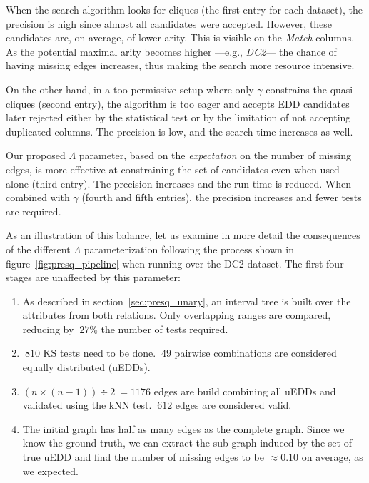 When the search algorithm looks for cliques (the first entry for each dataset),
the precision is high since almost all candidates were accepted. However,
these candidates are, on average, of lower arity. This is visible on the \emph{Match}
columns. As the potential maximal arity becomes higher ---e.g., \emph{DC2}--- the
chance of having missing edges increases, thus making the search more resource intensive.

On the other hand, in a too-permissive setup where only $\gamma$ constrains the quasi-cliques
(second entry), the algorithm is too eager and accepts \gls{EDD} candidates later rejected either
by the statistical test or by the limitation of not accepting duplicated columns.
The precision is low, and the search time increases as well.

Our proposed $\Lambda$ parameter, based on the \emph{expectation} on the number of missing edges,
is more effective at constraining the set of candidates even when used alone (third entry).
The precision increases and the run time is reduced.
When combined with $\gamma$ (fourth and fifth entries), the precision increases
and fewer tests are required.

As an illustration of this balance, let us examine in more detail the consequences of the
different $\Lambda$ parameterization following the process shown in figure~\ref{fig:presq_pipeline}
when running over the DC2 dataset. The first four stages are unaffected by this parameter:

\begin{enumerate}[label=({\alph*}),align=parleft,leftmargin=!,labelwidth=1em]
\item As described in section~\ref{sec:presq_unary}, an interval tree is built over the attributes
    from both relations. Only overlapping ranges are compared,
    reducing by $~27\%$ the number of tests required.
\item $~810$ KS tests need to be done. $~49$ pairwise combinations are considered equally distributed
    (\glspl{uEDD}).
\item $(n \times (n - 1)) \div 2 ~= 1176$ edges are build combining all \glspl{uEDD} and validated
    using the \gls{kNN} test. $~612$ edges are considered valid.
\item The initial graph has half as many edges as the complete graph.
    Since we know the ground truth, we can extract the sub-graph induced by the set of
    true \gls{uEDD} and find the number of missing edges to be $\approx 0.10$ on average,
    as we expected.
\end{enumerate}


